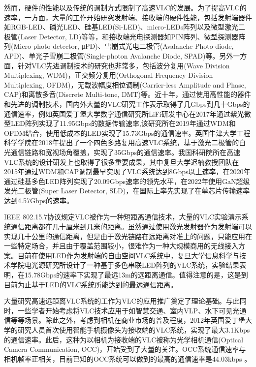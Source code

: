 然而，硬件的性能以及传统的调制方式限制了高速VLC的发展。为了提高VLC的速率，一方面，大量的工作开始研究发射端、接收端的硬件性能，包括发射端器件如RGB-LED、磷光LED、硅基LED(Si-LED)、micro-LEDs阵列以及微型激光二极管(Laser Detector, LD)等等\cite{1216-vlc-rgb,1217-vlc-blue-led,1218-vlc-si-led,1219-vlc-microled,12110-vlc-ld}，和接收端光电探测器如PIN阵列、微型探测器阵列(Micro-photo-detector, μPD)、雪崩式光电二极管(Avalanche Photo-diode, APD)、单光子雪崩二极管(Single-photon Avalanche Diode, SPAD)等\cite{12111-vlc-pin,12115-vls-upds,12112-vlc-apd,12114-vlc-spad,12113-vlc-spad}。另外一方面，针对VLC先进调制技术的研究也非常多，包括波分复用(Wave Division Multiplexing, WDM)，正交频分复用(Orthogonal Frequency Division Multiplexing, OFDM)，无载波幅度相位调制(Carrier-less Amplitude and Phase, CAP)和离散多音(Discrete Multi-tone, DMT)等\cite{12116-vlc-wdm,12117-vlc-ofdm,12118-vlc-ofdm,12119-vlc-cap,12120-vlc-cap,12121-vlc-cap,12122-vlc-dmt}。近十年，通过使用高性能的器件和先进的调制技术，国内外大量的VLC研究工作表示取得了几Gbps到几十Gbps的通信速率，例如英国爱丁堡大学数字通信研究所LiFi研发中心在2017年通过紫光微型LED阵列实现了11.95Gbps的数据传输速率\cite{12123-vlc-11.95G},该研究所在2019年通过WDM和OFDM结合，使用低成本的LED实现了15.73Gbps的通信速率\cite{12124-vlc-15.73G}。英国牛津大学工程科学学院在2018年提出了一个四色多路复用高速VLC系统，基于激光二极管的白光通信链路和宽视场角覆盖，实现了35Gbps的通信速率\cite{vlc-nature-35Gb}。我国科研院所在高速VLC系统的设计研发上也取得了很多重要成果，其中复旦大学迟楠教授团队在2015年通过WDM和CAP调制最早实现了VLC系统达到8Gbps以上速率\cite{vlc-chinan-8Gb}，在2020年通过硅基多色LED阵列实现了20.09Gbps速率的领先水平\cite{vlc-chinan-20.09Gb}，在2022年使用GaN超级发光二极管(Super Laser Detector, SLD)，在国际上率先实现了在单芯片传输速率达到4.57Gbps的速率\cite{vlc-chinan-4.57Gb}。

IEEE 802.15.7协议规定VLC被作为一种短距离通信技术，大量的VLC实验演示系统通信距离都在几十厘米到几米的距离。虽然通过使用激光发射器作为发射端可以实现几十公里的通信距离，但是由于激光链路在远距离对准上的问题，只能应用在一些特定场合，并且由于覆盖范围较小，很难作为一种大规模商用的无线接入方案。目前在使用LED作为发射端的自由空间VLC系统中，复旦大学信息科学与技术学院电光源研究所设计了一种基于多色串联LED阵列的VLC系统，实验结果表明，在15.78Gbps的速率下实现了最远13m的远距离通信\cite{vlc-longdistance-13m}。值得注意的是，这是到目前为止基于LED的VLC系统所能达到的最远通信距离。

大量研究高速远距离VLC系统的工作为VLC的应用推广奠定了理论基础。与此同时，一些学者开始考虑将VLC技术应用于如智慧交通\cite{vlc-v2x-1,vlc-v2x-2}、室内VLP\cite{vlc-vlp-1,vlc-vlp-2}、水下可见光通信\cite{vlc-uwoc}等等场景。除此之外，考虑到相机在商业市场的普及程度，2012年英国爱丁堡大学的研究人员首次使用智能手机摄像头为接收端的VLC系统，实现了最大3.1Kbps的通信速率\cite{vlc-occ-first2012}。此后，这种为以相机为接收端的VLC被称为光学相机通信(Optical Camera Communication, OCC)，开始受到了大量的关注\cite{vlc-occ,vlc-occ-2}。OCC系统通信速率与相机帧率正相关，目前已知的OCC系统可以做到的最高的通信速率是44.03kbps \cite{vlc-occ-5}。

